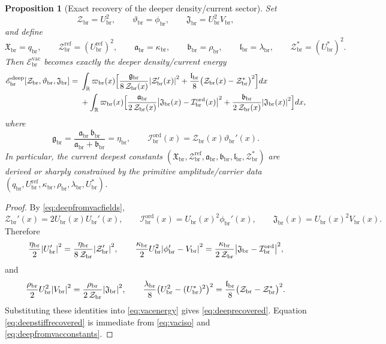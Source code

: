 \documentclass[11pt]{article}
\newcommand{\ProfWeight}{\varpi_{\mathrm{br}}}
\newcommand{\RespOrderCurrent}{\mathcal I_{\mathrm{br}}^{\mathrm{ord}}}
\newcommand{\RespOrderPhase}{\vartheta_{\mathrm{br}}}
\newcommand{\RespDeepDensity}{\mathcal Z_{\mathrm{br}}}
\newcommand{\RespDeepDensityRef}{\mathcal Z_{\mathrm{br}}^{\mathrm{ref}}}
\newcommand{\RespDeepDensityEq}{\mathcal Z_{\mathrm{br}}^{\ast}}
\newcommand{\RespDeepReadout}{\mathfrak X_{\mathrm{br}}}
\newcommand{\RespDeepTrack}{\mathfrak a_{\mathrm{br}}}
\newcommand{\RespDeepRelax}{\mathfrak b_{\mathrm{br}}}
\newcommand{\RespDeepStiff}{\mathfrak g_{\mathrm{br}}}
\newcommand{\RespDeepWell}{\mathfrak l_{\mathrm{br}}}
\newcommand{\RespDeepAux}{\mathfrak J_{\mathrm{br}}}
\newcommand{\RespDeepEnergy}{\mathscr E_{\mathrm{br}}^{\mathrm{deep}}}
\newcommand{\RespVacAmp}{U_{\mathrm{br}}}
\newcommand{\RespVacRef}{U_{\mathrm{br}}^{\mathrm{ref}}}
\newcommand{\RespVacEq}{U_{\mathrm{br}}^{\ast}}
\newcommand{\RespVacPhase}{\phi_{\mathrm{br}}}
\newcommand{\RespVacCarrier}{V_{\mathrm{br}}}
\newcommand{\RespVacReadout}{q_{\mathrm{br}}}
\newcommand{\RespVacCov}{\kappa_{\mathrm{br}}}
\newcommand{\RespVacRelax}{\rho_{\mathrm{br}}}
\newcommand{\RespVacWell}{\lambda_{\mathrm{br}}}
\newcommand{\RespVacIso}{\eta_{\mathrm{br}}}
\newcommand{\RespVacEnergy}{\mathscr E_{\mathrm{br}}^{\mathrm{vac}}}
\newtheorem{proposition}{Proposition}
\begin{document}
\begin{proposition}[Exact recovery of the deeper density/current sector]
\label{prop:deeprecovery}
Set
\begin{equation}
\RespDeepDensity=\RespVacAmp^2,
\qquad
\RespOrderPhase=\RespVacPhase,
\qquad
\RespDeepAux=\RespVacAmp^2\RespVacCarrier,
\label{eq:deepfromvacfields}
\end{equation}
and define
\begin{equation}
\RespDeepReadout=\RespVacReadout,
\qquad
\RespDeepDensityRef=(\RespVacRef)^2,
\qquad
\RespDeepTrack=\RespVacCov,
\qquad
\RespDeepRelax=\RespVacRelax,
\qquad
\RespDeepWell=\RespVacWell,
\qquad
\RespDeepDensityEq=(\RespVacEq)^2.
\label{eq:deepfromvacconstants}
\end{equation}
Then \(\RespVacEnergy\) becomes exactly the deeper density/current energy
\begin{align}
\RespDeepEnergy[\RespDeepDensity,\RespOrderPhase,\RespDeepAux]
=\;&
\int_{\mathbb R}\ProfWeight(x)\Bigl[
\frac{\RespDeepStiff}{8\,\RespDeepDensity(x)}\abs{\RespDeepDensity'(x)}^2
+
\frac{\RespDeepWell}{8}\bigl(\RespDeepDensity(x)-\RespDeepDensityEq\bigr)^2
\Bigr]dx
\nonumber\\
&+
\int_{\mathbb R}\ProfWeight(x)\Bigl[
\frac{\RespDeepTrack}{2\,\RespDeepDensity(x)}\abs{\RespDeepAux(x)-\RespOrderCurrent(x)}^2
+
\frac{\RespDeepRelax}{2\,\RespDeepDensity(x)}\abs{\RespDeepAux(x)}^2
\Bigr]dx,
\label{eq:deeprecovered}
\end{align}
where
\begin{equation}
\RespDeepStiff=\frac{\RespDeepTrack\,\RespDeepRelax}{\RespDeepTrack+\RespDeepRelax}
=\RespVacIso,
\qquad
\RespOrderCurrent(x)=\RespDeepDensity(x)\RespOrderPhase'(x).
\label{eq:deepstiffrecovered}
\end{equation}
In particular, the current deepest constants \((\RespDeepReadout,\RespDeepDensityRef,\RespDeepTrack,\RespDeepRelax,\RespDeepWell,\RespDeepDensityEq)\) are derived or sharply constrained by the primitive amplitude/carrier data \((\RespVacReadout,\RespVacRef,\RespVacCov,\RespVacRelax,\RespVacWell,\RespVacEq)\).
\end{proposition}

\begin{proof}
By \eqref{eq:deepfromvacfields},
\[
\RespDeepDensity'(x)=2\RespVacAmp(x)\RespVacAmp'(x),
\qquad
\RespOrderCurrent(x)=\RespVacAmp(x)^2\RespVacPhase'(x),
\qquad
\RespDeepAux(x)=\RespVacAmp(x)^2\RespVacCarrier(x).
\]
Therefore
\[
\frac{\RespVacIso}{2}\abs{\RespVacAmp'}^2
=
\frac{\RespVacIso}{8\,\RespDeepDensity}\abs{\RespDeepDensity'}^2,
\qquad
\frac{\RespVacCov}{2}\RespVacAmp^2\abs{\RespVacPhase'-\RespVacCarrier}^2
=
\frac{\RespVacCov}{2\,\RespDeepDensity}\abs{\RespDeepAux-\RespOrderCurrent}^2,
\]
and
\[
\frac{\RespVacRelax}{2}\RespVacAmp^2\abs{\RespVacCarrier}^2
=
\frac{\RespVacRelax}{2\,\RespDeepDensity}\abs{\RespDeepAux}^2,
\qquad
\frac{\RespVacWell}{8}\bigl(\RespVacAmp^2-(\RespVacEq)^2\bigr)^2
=
\frac{\RespDeepWell}{8}\bigl(\RespDeepDensity-\RespDeepDensityEq\bigr)^2.
\]
Substituting these identities into \eqref{eq:vacenergy} gives \eqref{eq:deeprecovered}. Equation \eqref{eq:deepstiffrecovered} is immediate from \eqref{eq:vaciso} and \eqref{eq:deepfromvacconstants}.
\end{proof}
\end{document}
